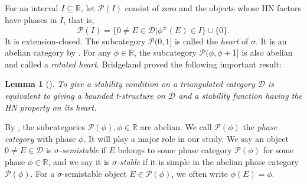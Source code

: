 \documentclass[a4paper,12pt]{amsart}
\numberwithin{equation}{section}
\newtheorem{lemma}[theorem]{Lemma}
\newcommand{\1}{\mathbf{1}}
\begin{document}
For an interval $I\subseteq\mathbb{R}$, let $\mathcal{P}(I)$ consist of zero and the objects whose HN factors have phases in $I$, that is,
\[\mathcal{P}(I)=\{0\neq E\in\mathcal{D}|\phi^{\pm}(E)\in I\}\cup\{0\}.\]
It is extension-closed. The subcategory $\mathcal{P}(0,1]$ is called the \emph{heart} of $\sigma$. It is an abelian category by \cite[Section 3]{Bri2007}. For any $\phi\in\mathbb{R}$, the subcategory $\mathcal{P}(\phi,\phi+1]$ is also abelian and called a \emph{rotated heart}. Bridgeland proved the following important result:
\begin{lemma}[{\cite[Proposition 5.3]{Bri2007}}]\label{heart}
    To give a stability condition on a triangulated category $\mathcal{D}$ is equivalent to giving a bounded t-structure on $\mathcal{D}$ and a stability function having the HN property on its heart.
\end{lemma}

By \cite[Lemma 5.2]{Bri2007}, the subcategories $\mathcal{P}(\phi),\phi\in\mathbb{R}$ are abelian. We call $\mathcal{P}(\phi)$ the \emph{phase category} with phase $\phi$. It will play a major role in our study. We say an object $0\neq E\in\mathcal{D}$ is \emph{$\sigma$-semistable} if $E$ belongs to some phase category $\mathcal{P}(\phi)$ for some phase $\phi\in\mathbb{R}$, and we say it is \emph{$\sigma$-stable} if it is simple in the abelian phase category $\mathcal{P}(\phi)$. For a $\sigma$-semistable object $E\in\mathcal{P}(\phi)$, we often write $\phi(E)=\phi$.
\end{document}
